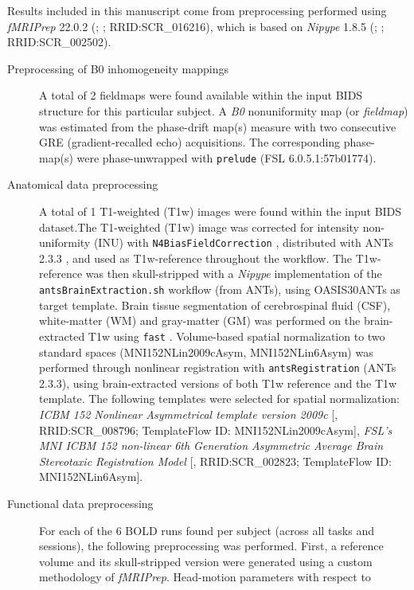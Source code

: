 \documentclass[
]{article}
\author{}
\date{}
\begin{document}
Results included in this manuscript come from preprocessing performed
using \emph{fMRIPrep} 22.0.2 (\citet{fmriprep1}; \citet{fmriprep2};
RRID:SCR\_016216), which is based on \emph{Nipype} 1.8.5
(\citet{nipype1}; \citet{nipype2}; RRID:SCR\_002502).

\begin{description}
\item[Preprocessing of B0 inhomogeneity mappings]
A total of 2 fieldmaps were found available within the input BIDS
structure for this particular subject. A \emph{B0} nonuniformity map (or
\emph{fieldmap}) was estimated from the phase-drift map(s) measure with
two consecutive GRE (gradient-recalled echo) acquisitions. The
corresponding phase-map(s) were phase-unwrapped with \texttt{prelude}
(FSL 6.0.5.1:57b01774).
\item[Anatomical data preprocessing]
A total of 1 T1-weighted (T1w) images were found within the input BIDS
dataset.The T1-weighted (T1w) image was corrected for intensity
non-uniformity (INU) with \texttt{N4BiasFieldCorrection} \citep{n4},
distributed with ANTs 2.3.3 \citep[RRID:SCR\_004757]{ants}, and used as
T1w-reference throughout the workflow. The T1w-reference was then
skull-stripped with a \emph{Nipype} implementation of the
\texttt{antsBrainExtraction.sh} workflow (from ANTs), using OASIS30ANTs
as target template. Brain tissue segmentation of cerebrospinal fluid
(CSF), white-matter (WM) and gray-matter (GM) was performed on the
brain-extracted T1w using \texttt{fast} \citep[FSL 6.0.5.1:57b01774,
RRID:SCR\_002823,][]{fsl_fast}. Volume-based spatial normalization to
two standard spaces (MNI152NLin2009cAsym, MNI152NLin6Asym) was performed
through nonlinear registration with \texttt{antsRegistration} (ANTs
2.3.3), using brain-extracted versions of both T1w reference and the T1w
template. The following templates were selected for spatial
normalization: \emph{ICBM 152 Nonlinear Asymmetrical template version
2009c} {[}\citet{mni152nlin2009casym}, RRID:SCR\_008796; TemplateFlow
ID: MNI152NLin2009cAsym{]}, \emph{FSL's MNI ICBM 152 non-linear 6th
Generation Asymmetric Average Brain Stereotaxic Registration Model}
{[}\citet{mni152nlin6asym}, RRID:SCR\_002823; TemplateFlow ID:
MNI152NLin6Asym{]}.
\item[Functional data preprocessing]
For each of the 6 BOLD runs found per subject (across all tasks and
sessions), the following preprocessing was performed. First, a reference
volume and its skull-stripped version were generated using a custom
methodology of \emph{fMRIPrep}. Head-motion parameters with respect to

\end{description}
\end{document}
